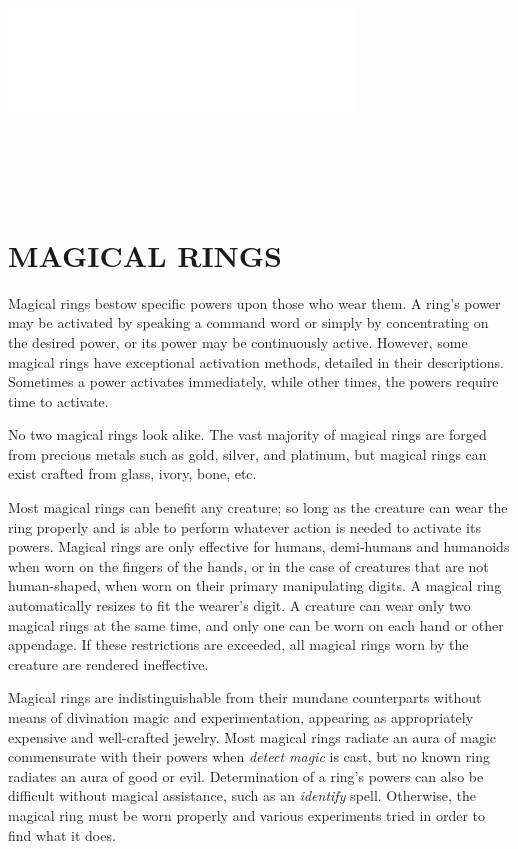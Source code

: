 \begin{multicols}{2}
\noindent\includegraphics[width=3.6in, height=2.75in]{testblock.pdf}

\section{MAGICAL RINGS}

Magical rings bestow specific powers upon those who wear them.  A ring's power may be activated by speaking a command word or simply by concentrating on the desired power, or its power may be continuously active.  However, some magical rings have exceptional activation methods, detailed in their descriptions.  Sometimes a power activates immediately, while other times, the powers require time to activate.

No two magical rings look alike.  The vast majority of magical rings are forged from precious metals such as gold, silver, and platinum, but magical rings can exist crafted from glass, ivory, bone, etc.  

Most magical rings can benefit any creature; so long as the creature can wear the ring properly and is able to perform whatever action is needed to activate its powers.  Magical rings are only effective for humans, demi-humans and humanoids when worn on the fingers of the hands, or in the case of creatures that are not human-shaped, when worn on their primary manipulating digits.  A magical ring automatically resizes to fit the wearer's digit.  A creature can wear only two magical rings at the same time, and only one can be worn on each hand or other appendage.  If these restrictions are exceeded, all magical rings worn by the creature are rendered ineffective.  

Magical rings are indistinguishable from their mundane counterparts without means of divination magic and experimentation, appearing as appropriately expensive and well-crafted jewelry.  Most magical rings radiate an aura of magic commensurate with their powers when \textit{detect magic} is cast, but no known ring radiates an aura of good or evil.  Determination of a ring's powers can also be difficult without magical assistance, such as an \textit{identify} spell.  Otherwise, the magical ring must be worn properly and various experiments tried in order to find what it does.


\end{multicols}
